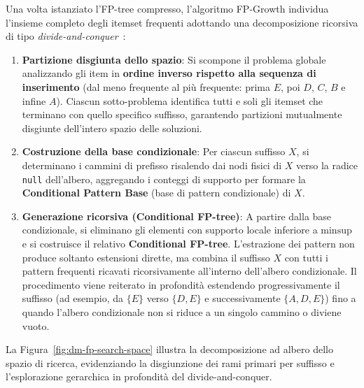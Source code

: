 Una volta istanziato l'FP-tree compresso, l'algoritmo FP-Growth individua l'insieme completo degli itemset frequenti adottando una decomposizione ricorsiva di tipo \textit{divide-and-conquer}~\cite{han2000}:
\begin{enumerate}
    \item \textbf{Partizione disgiunta dello spazio}: Si scompone il problema globale analizzando gli item in \textbf{ordine inverso rispetto alla sequenza di inserimento} (dal meno frequente al più frequente: prima $E$, poi $D$, $C$, $B$ e infine $A$). Ciascun sotto-problema identifica tutti e soli gli itemset che terminano con quello specifico suffisso, garantendo partizioni mutualmente disgiunte dell'intero spazio delle soluzioni.
    \item \textbf{Costruzione della base condizionale}: Per ciascun suffisso $X$, si determinano i cammini di prefisso risalendo dai nodi fisici di $X$ verso la radice \texttt{null} dell'albero, aggregando i conteggi di supporto per formare la \textbf{Conditional Pattern Base} (base di pattern condizionale) di $X$.
    \item \textbf{Generazione ricorsiva (Conditional FP-tree)}: A partire dalla base condizionale, si eliminano gli elementi con supporto locale inferiore a $\text{minsup}$ e si costruisce il relativo \textbf{Conditional FP-tree}. L'estrazione dei pattern non produce soltanto estensioni dirette, ma combina il suffisso $X$ con tutti i pattern frequenti ricavati ricorsivamente all'interno dell'albero condizionale. Il procedimento viene reiterato in profondità estendendo progressivamente il suffisso (ad esempio, da $\{E\}$ verso $\{D, E\}$ e successivamente $\{A, D, E\}$) fino a quando l'albero condizionale non si riduce a un singolo cammino o diviene vuoto.
\end{enumerate}

La Figura~\ref{fig:dm-fp-search-space} illustra la decomposizione ad albero dello spazio di ricerca, evidenziando la disgiunzione dei rami primari per suffisso e l'esplorazione gerarchica in profondità del divide-and-conquer.

